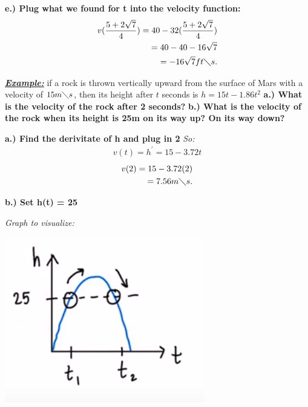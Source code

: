 \documentclass{report}
\begin{document}
    \bigbreak \noindent 
    \textbf{e.) Plug what we found for t into the velocity function:}
    \begin{align*}
      v(\frac{5+2\sqrt{7}}{4}) = 40-32(\frac{5+2\sqrt{7}}{4}) \\
      = 40 - 40-16\sqrt{7} \\
      = -16\sqrt{7} ft\diagdown s
    .\end{align*}

    \bigbreak \noindent 
    \begin{mdframed}
      \textbf{\textit{\underline{Example:}}} if a rock is thrown vertically upward from the surface of Mars 
      with a velocity of $15 m \diagdown s$, then its height after $t$ seconds is $h = 15t - 1.86t^{2}$
       \bigbreak \noindent 
       \textbf{a.) What is the velocity of the rock after 2 seconds?}
       \smallbreak \noindent
       \textbf{b.) What is the velocity of the rock when its height is 25m on its way up? On its way down?}
    \end{mdframed}

    \bigbreak \noindent 
    \textbf{a.) Find the derivitate of h and plug in 2}
    \bigbreak \noindent
    \textit{So:}
    \begin{align*}
      v(t) = h^{\prime} = 15 - 3.72t
    \end{align*}
    \begin{align*}
      v(2)=  15 - 3.72(2) \\ 
      = 7.56 m \diagdown s
    .\end{align*}

    \bigbreak \noindent 
    \textbf{b.) Set h(t) = 25} 

    \bigbreak \noindent 
    \textit{Graph to visualize:}
    \begin{center}
      \includegraphics[scale=0.8]{4.png}
    \end{center}
\end{document}
